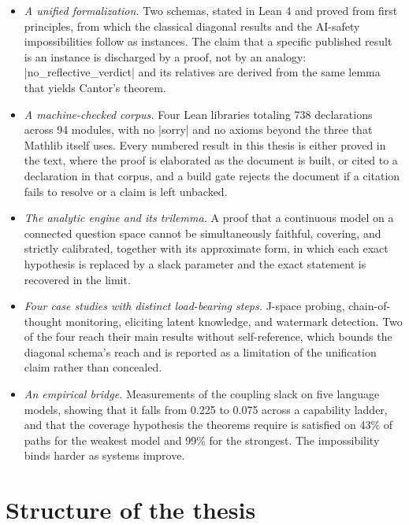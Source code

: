 \documentclass{memoir}
\begin{document}
\begin{itemize}
\item \emph{A unified formalization.} Two schemas, stated in Lean 4 and proved from
   first principles, from which the classical diagonal results and the
   AI-safety impossibilities follow as instances. The claim that a specific
   published result is an instance is discharged by a proof, not by an
   analogy: \LeanVerb|no_reflective_verdict| and its relatives are derived from
   the same lemma that yields Cantor's theorem.
\item \emph{A machine-checked corpus.} Four Lean libraries totaling 738 declarations
   across 94 modules, with no \LeanVerb|sorry| and no axioms beyond the three that
   Mathlib itself uses. Every numbered result in this thesis is either proved
   in the text, where the proof is elaborated as the document is built, or
   cited to a declaration in that corpus, and a build gate rejects the document
   if a citation fails to resolve or a claim is left unbacked.
\item \emph{The analytic engine and its trilemma.} A proof that a continuous model on a
   connected question space cannot be simultaneously faithful, covering, and
   strictly calibrated, together with its approximate form, in which each exact
   hypothesis is replaced by a slack parameter and the exact statement is
   recovered in the limit.
\item \emph{Four case studies with distinct load-bearing steps.} J-space probing,
   chain-of-thought monitoring, eliciting latent knowledge, and watermark
   detection. Two of the four reach their main results without self-reference,
   which bounds the diagonal schema's reach and is reported as a limitation of
   the unification claim rather than concealed.
\item \emph{An empirical bridge.} Measurements of the coupling slack on five language
   models, showing that it falls from 0.225 to 0.075 across a capability
   ladder, and that the coverage hypothesis the theorems require is satisfied
   on 43\% of paths for the weakest model and 99\% for the strongest. The
   impossibility binds harder as systems improve.

\end{itemize}




\section{Structure of the thesis}\label{Two--Schemas--of--Impossibility-005F-005F-005F--Machine--Checked--Limits--of--Trustworthy--Machine--Learning-005F-005F-005F--and--Why--They--Tighten--with--Capability----Introduction----Structure--of--the--thesis}
\end{document}

